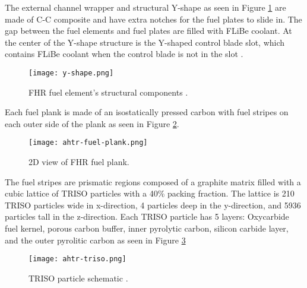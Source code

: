 The external channel wrapper and structural Y-shape as seen in Figure 
\ref{fig:y-shape} are made of C-C composite and have extra notches for the 
fuel plates to slide in. 
The gap between the fuel elements and fuel plates are filled with \gls{FLiBe}
coolant. 
At the center of the Y-shape structure is the Y-shaped control blade slot, 
which contains \gls{FLiBe} coolant when the control blade is not in the slot
\cite{varma_ahtr_2012,ramey_monte_2018,noauthor_fluoride_nodate}.
\begin{figure}[]
    \centering
    \texttt{[image: y-shape.png]} 
    \caption{FHR fuel element's structural components \cite{noauthor_fluoride_nodate}.}
    \label{fig:y-shape}
\end{figure}
Each fuel plank is made of an isostatically pressed carbon with fuel stripes 
on each outer side of the plank as seen in Figure \ref{fig:ahtr-fuel-plank}. 
\begin{figure}[]
    \centering
    \texttt{[image: ahtr-fuel-plank.png]} 
    \caption{2D view of FHR fuel plank.}
    \label{fig:ahtr-fuel-plank}
\end{figure}
The fuel stripes are prismatic regions composed of a graphite matrix filled with 
a cubic lattice of \gls{TRISO} particles with a 40\% packing fraction. 
The lattice is 210 \gls{TRISO} particles wide in x-direction, 4 particles deep in 
the y-direction, and 5936 particles tall in the z-direction. 
Each \gls{TRISO} particle has 5 layers: Oxycarbide fuel kernel, porous carbon 
buffer, inner pyrolytic carbon, silicon carbide layer, and the outer pyrolitic 
carbon as seen in Figure \ref{fig:ahtr-triso}
\begin{figure}[]
    \centering
    \texttt{[image: ahtr-triso.png]} 
    \caption{TRISO particle schematic \cite{noauthor_fluoride_nodate}.}
    \label{fig:ahtr-triso}
\end{figure}

